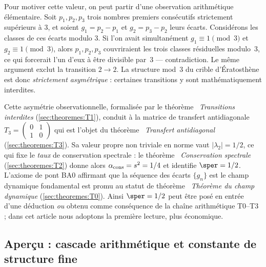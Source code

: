 Pour motiver cette valeur, on peut partir d'une observation arithmétique élémentaire. Soit $p_1, p_2, p_3$ trois nombres premiers consécutifs strictement supérieurs à $3$, et soient $g_1 = p_2 - p_1$ et $g_2 = p_3 - p_2$ leurs écarts. Considérons les classes de ces écarts modulo $3$. Si l'on avait simultanément $g_1 \equiv 1 \pmod 3$ et $g_2 \equiv 1 \pmod 3$, alors $p_1, p_2, p_3$ couvriraient les trois classes résiduelles modulo~$3$, ce qui forcerait l'un d'eux à être divisible par~$3$ --- contradiction. Le même argument exclut la transition $2 \to 2$. La structure mod~$3$ du crible d'Ératosthène est donc \emph{strictement asymétrique} : certaines transitions y sont mathématiquement interdites.

Cette asymétrie observationnelle, formalisée par le théorème~\Tone{} \emph{Transitions interdites} (\ref{sec:theoremes:T1}), conduit à la matrice de transfert antidiagonale $T_3 = \begin{pmatrix} 0 & 1 \\ 1 & 0 \end{pmatrix}$ qui est l'objet du théorème~\Tthree{} \emph{Transfert antidiagonal} (\ref{sec:theoremes:T3}). Sa valeur propre non triviale en norme vaut $|\lambda_2| = 1/2$, ce qui fixe le \emph{taux} de conservation spectrale : le théorème~\Ttwo{} \emph{Conservation spectrale} (\ref{sec:theoremes:T2}) donne alors $\alpha_{\rm cons} = s^2 = 1/4$ et identifie $\sper = 1/2$. L'axiome de pont BA0 affirmant que la séquence des écarts $\{g_n\}$ est le champ dynamique fondamental est promu au statut de théorème~\Tzero{} \emph{Théorème du champ dynamique} (\ref{sec:theoremes:T0}). Ainsi $\sper = 1/2$ peut être posé en entrée d'une déduction \emph{ou} obtenu comme conséquence de la chaîne arithmétique T0--T3 ; dans cet article nous adoptons la première lecture, plus économique.

\subsection{Aperçu : cascade arithmétique et constante de structure fine}
\label{sec:intro:apercu}

